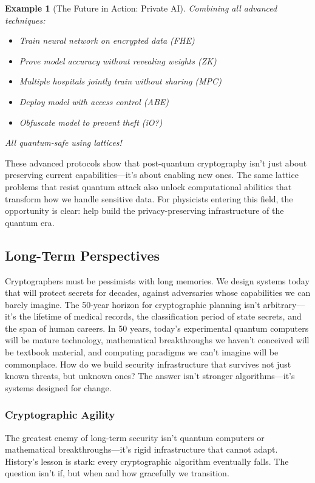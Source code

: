 \documentclass[11pt,a4paper]{article}
\newtheorem{example}{Example}
\begin{document}
\begin{example}[The Future in Action: Private AI]
Combining all advanced techniques:
\begin{itemize}
    \item Train neural network on encrypted data (FHE)
    \item Prove model accuracy without revealing weights (ZK)
    \item Multiple hospitals jointly train without sharing (MPC)
    \item Deploy model with access control (ABE)
    \item Obfuscate model to prevent theft (iO?)
\end{itemize}
All quantum-safe using lattices!
\end{example}

These advanced protocols show that post-quantum cryptography isn't just about preserving current capabilities—it's about enabling new ones. The same lattice problems that resist quantum attack also unlock computational abilities that transform how we handle sensitive data. For physicists entering this field, the opportunity is clear: help build the privacy-preserving infrastructure of the quantum era.

\subsection{Long-Term Perspectives}
\label{sec:long-term}

Cryptographers must be pessimists with long memories. We design systems today that will protect secrets for decades, against adversaries whose capabilities we can barely imagine. The 50-year horizon for cryptographic planning isn't arbitrary—it's the lifetime of medical records, the classification period of state secrets, and the span of human careers. In 50 years, today's experimental quantum computers will be mature technology, mathematical breakthroughs we haven't conceived will be textbook material, and computing paradigms we can't imagine will be commonplace. How do we build security infrastructure that survives not just known threats, but unknown ones? The answer isn't stronger algorithms—it's systems designed for change.

\subsubsection{Cryptographic Agility}

The greatest enemy of long-term security isn't quantum computers or mathematical breakthroughs—it's rigid infrastructure that cannot adapt. History's lesson is stark: every cryptographic algorithm eventually falls. The question isn't if, but when and how gracefully we transition.
\end{document}
